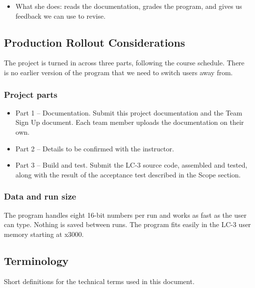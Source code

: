 \documentclass[11pt]{article}
\begin{document}
\begin{itemize}
  \item What she does: reads the documentation, grades the program, and gives us feedback we can use to revise.
\end{itemize}

\subsection*{Production Rollout Considerations}

The project is turned in across three parts, following the course schedule. There is no earlier version of the program that we need to switch users away from.


\subsubsection*{Project parts}

\begin{itemize}
  \item Part 1 -- Documentation. Submit this project documentation and the Team Sign Up document. Each team member uploads the documentation on their own.
  \item Part 2 -- Details to be confirmed with the instructor.
  \item Part 3 -- Build and test. Submit the LC-3 source code, assembled and tested, along with the result of the acceptance test described in the Scope section.
\end{itemize}
\subsubsection*{Data and run size}

The program handles eight 16-bit numbers per run and works as fast as the user can type. Nothing is saved between runs. The program fits easily in the LC-3 user memory starting at x3000.


\subsection*{Terminology}

Short definitions for the technical terms used in this document.
\end{document}
